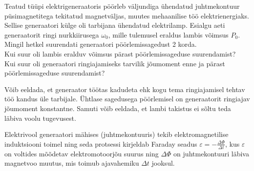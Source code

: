 
Teatud tüüpi elektrigeneraatoris pöörleb väljundiga ühendatud juhtmekontuur
püsimagnetitega tekitatud magnetväljas, muutes mehaanilise töö elektrienergiaks.
Sellise generaatori külge oli tarbijana ühendatud elektrilamp. Esialgu aeti
generaatorit ringi nurkkiirusega $\omega_0$, mille tulemusel eraldus lambis
võimsus $P_0$. Mingil hetkel suurendati generaatori pöörlemissagedust 2 korda.\\
\osa Kui suur oli lambis eralduv võimsus pärast pöörlemissageduse suurendamist?\\
\osa Kui suur oli generaatori ringiajamiseks tarvilik jõumoment enne ja
pärast pöörlemissageduse suurendamist?

Võib eeldada, et generaator töötas kadudeta ehk kogu tema ringiajamisel tehtav
töö kandus üle tarbijale. Ühtlase sagedusega pöörlemisel on generaatorit
ringiajav jõumoment konstantne. Samuti võib eeldada, et lambi takistus ei sõltu
teda läbiva voolu tugevusest.

\hint
Elektrivool generaatori mähises (juhtmekontuuris) tekib elektromagnetilise induktsiooni toimel ning seda protsessi kirjeldab Faraday seadus $\varepsilon = -\frac{\Delta\Phi}{\Delta t}$, kus $\varepsilon$ on voltides mõõdetav elektromotoorjõu suurus ning $\Delta\Phi$ on juhtmekontuuri läbiva magnetvoo muutus, mis toimub ajavahemiku $\Delta t$ jooksul.

